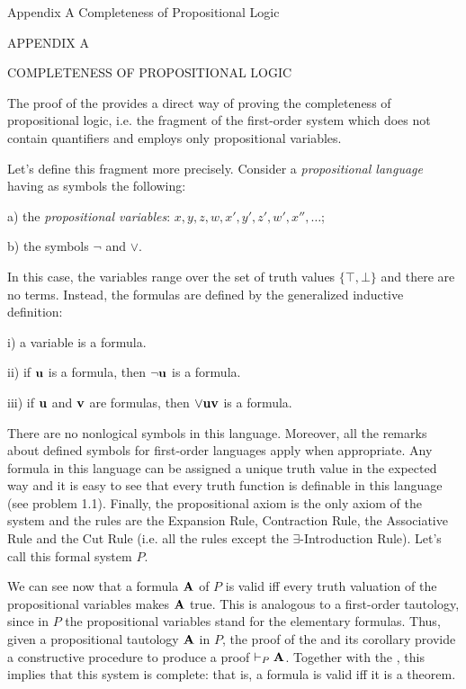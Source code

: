  {Appendix A Completeness of Propositional Logic}
\centerline{\xmplbxi APPENDIX A}
\medskip
\centerline{\xmplbx COMPLETENESS OF PROPOSITIONAL LOGIC}
\bigskip

The proof of the  provides a direct way of proving the completeness 
of propositional logic, i.e. the fragment of the first-order system which does not
contain quantifiers and employs only propositional variables.

Let's define this fragment more precisely. Consider a {\it propositional language} having as symbols the following:
\item{a)} the {\it propositional variables}: $x, y, z, w, x', y', z', w', x'', \dots$;
\item{b)} the symbols $\neg$ and $\lor$.

In this case, the variables range over the set of truth values $\{\top, \bot\}$ and there are no terms. Instead,
the formulas are defined by the generalized inductive definition:
\item{i)} a variable is a formula.
\item{ii)} if ${\bf u}$ is a formula, then $\neg{\bf u}$ is a formula.
\item{iii)} if ${\bf u}$ and ${\bf v}$ are formulas, then $\lor{\bf u}{\bf v}$ is a formula.

There are no nonlogical symbols in this language. Moreover, all the remarks about defined symbols for
first-order languages apply when appropriate. Any formula in this language can be assigned a unique
truth value in the expected way and it is easy to see that every truth function is definable in this language
(see problem 1.1). Finally, the propositional axiom is the only axiom of the system and the rules are the Expansion Rule, Contraction Rule, 
the Associative Rule and the Cut Rule (i.e. all the rules except the $\exists$-Introduction Rule). Let's
call this formal system $P$.

We can see now that a formula ${\bf A}$ of $P$ is valid iff every truth valuation of the propositional
variables makes ${\bf A}$ true. This is analogous to a first-order tautology, since in $P$ the propositional
variables stand for the elementary formulas. Thus, given a propositional tautology ${\bf A}$ in $P$, the proof of the
 and its corollary provide a constructive procedure to
produce a proof $\vdash_P {\bf A}$. Together with the , this
implies that this system is complete: that is, a formula is valid iff it is a theorem.

\vfill
\break
